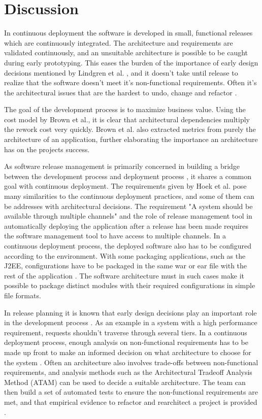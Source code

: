 \documentclass[conference]{IEEEtran}
\begin{document}
\section{Discussion} %

In continuous deployment the software is developed in small, functional releases which are continuously integrated. The architecture and requirements are validated continuously, and an unsuitable architecture is possible to be caught during early prototyping. This eases the burden of the importance of early design decisions mentioned by Lindgren et al. \cite{bass2003software}, and it doesn't take until release to realize that the software doesn't meet it's non-functional requirements. Often it's the architectural issues that are the hardest to undo, change and refactor \cite{kruchten2010software}.

The goal of the development process is to maximize business value. Using the cost model \cite{brown2011analysis} by Brown et al., it is clear that architectural dependencies multiply the rework cost very quickly. Brown et al. also extracted metrics from purely the architecture of an application, further elaborating the importance an architecture has on the projects success.

As software release management is primarily concerned in building a bridge between the development process and deployment process \cite{van1997software}, it shares a common goal with continuous deployment. The requirements given by Hoek et al. pose many similarities to the continuous deployment practices, and some of them can be addresses with architectural decisions. The requirement "A system should be available through multiple channels" and the role of release management tool in automatically deploying the application after a release has been made requires the software management tool to have access to multiple channels. In a continuous deployment process, the deployed software also has to be configured according to the environment. With some packaging applications, such as the J2EE, configurations have to be packaged in the same war or ear file with the rest of the application \cite{cdbook}. The software architecture must in such cases make it possible to package distinct modules with their required configurations in simple file formats.
 
In release planning it is known that early design decisions play an important role in the development process \cite{lindgren2008importance}. As an example in a system with a high performance requirement, requests shouldn't traverse through several tiers. In a continuous deployment process, enough analysis on non-functional requirements has to be made up front to make an informed decision on what architecture to choose for the system \cite{cdbook}. Often an architecture also involves trade-offs between non-functional requirements, and analysis methods such as the Architectural Tradeoff Analysis Method (ATAM) \cite{kazman1998architecture} can be used to decide a suitable architecture. The team can then build a set of automated tests to ensure the non-functional requirements are met, and that empirical evidence to refactor and rearchitect a project is provided \cite{cdbook}.
\end{document}
